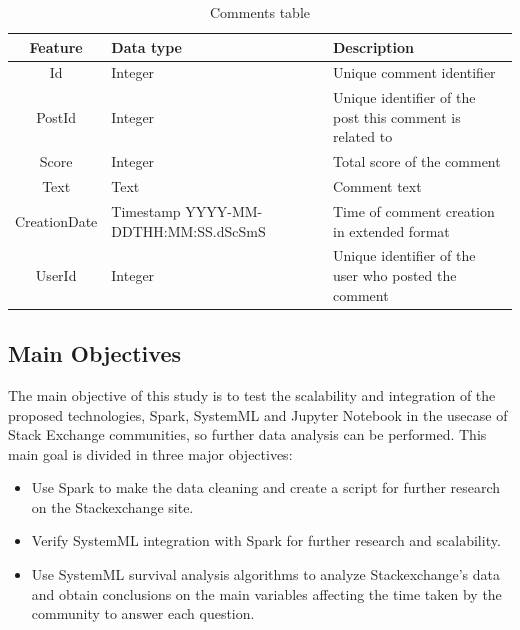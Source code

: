 \documentclass[11pt]{article} %
\begin{document}
      \begin{table}[!ht]
        \centering
        \begin{tabular}{|c|p{}|p{}|}
          \hline

          Feature & Data type & Description \\ \hline
          Id & Integer & Unique comment identifier \\ \hline
          PostId & Integer & Unique identifier of the post this comment is related to \\ \hline
          Score & Integer & Total score of the comment \\ \hline
          Text & Text & Comment text \\ \hline
          CreationDate & Timestamp YYYY-MM-DDTHH:MM:SS.dScSmS & Time of comment creation in extended format \\ \hline
          UserId & Integer & Unique identifier of the user who posted the comment \\

          \hline
        \end{tabular}
        \caption{Comments table}
        \label{tab:comments}
      \end{table}

\newpage

  \subsection{Main Objectives}

    The main objective of this study is to test the scalability and integration of the proposed technologies, Spark, SystemML and Jupyter Notebook in the usecase of Stack Exchange communities, so further data analysis can be performed. This main goal is divided in three major objectives:

    \begin{itemize}

      \item Use Spark to make the data cleaning and create a script for further research on the Stackexchange site.

      \item Verify SystemML integration with Spark for further research and scalability.

      \item Use SystemML survival analysis algorithms to analyze Stackexchange's data and obtain conclusions on the main variables affecting the time taken by the community to answer each question.

    \end{itemize}
\end{document}
